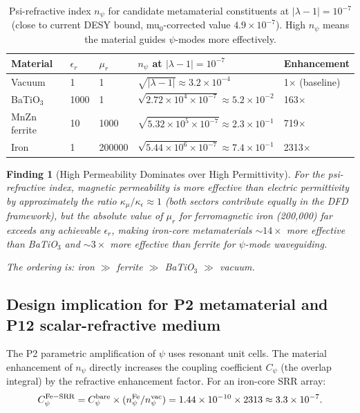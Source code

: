 \documentclass[11pt]{article}
\newtheorem{finding}{Finding}
\newcommand{\ee}[1]{\times 10^{#1}}
\begin{document}
\begin{table}[h]
\centering
\caption{Psi-refractive index $n_\psi$ for candidate metamaterial constituents
at $|\lambda-1| = 10^{-7}$ (close to current DESY bound, mu$_0$-corrected value
$4.9\ee{-7}$). High $n_\psi$ means the material guides $\psi$-modes more
effectively.}
\label{tab:n-psi}
\begin{tabular}{lllll}
\toprule
Material & $\epsilon_r$ & $\mu_r$ & $n_\psi$ at $|\lambda-1|=10^{-7}$ & Enhancement \\
\midrule
Vacuum & 1 & 1 & $\sqrt{|\lambda-1|} \approx 3.2\ee{-4}$ & 1$\times$ (baseline) \\
BaTiO$_3$ & 1000 & 1 & $\sqrt{2.72\ee{4} \times 10^{-7}} \approx 5.2\ee{-2}$ & 163$\times$ \\
MnZn ferrite & 10 & 1000 & $\sqrt{5.32\ee{5} \times 10^{-7}} \approx 2.3\ee{-1}$ & 719$\times$ \\
Iron & 1 & 200000 & $\sqrt{5.44\ee{6} \times 10^{-7}} \approx 7.4\ee{-1}$ & 2313$\times$ \\
\bottomrule
\end{tabular}
\end{table}

\begin{finding}[High Permeability Dominates over High Permittivity]
For the psi-refractive index, magnetic permeability is more effective than
electric permittivity by approximately the ratio $\kappa_\mu/\kappa_\epsilon \approx 1$
(both sectors contribute equally in the DFD framework), but the
\emph{absolute value} of $\mu_r$ for ferromagnetic iron (200,000) far exceeds
any achievable $\epsilon_r$, making iron-core metamaterials
$\sim 14\times$ more effective than BaTiO$_3$ and $\sim 3\times$ more
effective than ferrite for $\psi$-mode waveguiding.

The ordering is: iron $\gg$ ferrite $\gg$ BaTiO$_3$ $\gg$ vacuum.
\end{finding}

\subsection{Design implication for P2 metamaterial and P12 scalar-refractive
medium}

The P2 parametric amplification of $\psi$ uses resonant unit cells. The
material enhancement of $n_\psi$ directly increases the coupling coefficient
$C_\psi$ (the overlap integral) by the refractive enhancement factor. For
an iron-core SRR array:
\begin{equation}
C_\psi^{\rm Fe-SRR} = C_\psi^{\rm bare} \times (n_\psi^{\rm Fe}/n_\psi^{\rm vac})
= 1.44\ee{-10} \times 2313 \approx 3.3\ee{-7}.
\label{eq:Cpsi-FeSRR}
\end{equation}
\end{document}
